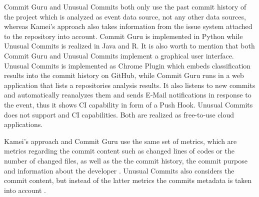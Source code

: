 Commit Guru and Unusual Commits both only use the past commit history of the project which is analyzed as event data source, not any other data sources, whereas Kamei's approach also takes information from the issue system attached to the repository into account.
Commit Guru is implemented in Python while Unusual Commits is realized in Java and R. It is also worth to mention that both Commit Guru and Unusual Commits implement a graphical user interface. Unusual Commits is implemented as Chrome Plugin which embeds classification results into the commit history on GitHub, while Commit Guru runs in a web application that lists a repositories analysis results. It also listens to new commits and automatically reanalyzes them and sends E-Mail notifications in response to the event, thus it shows CI capability in form of a Push Hook. Unusual Commits does not support and CI capabilities. Both are realized as free-to-use cloud applications. \cite{Rosen2015,Goyal2017,Kamei2013}

Kamei's approach and Commit Guru use the same set of metrics, which are metrics regarding the commit content such as changed lines of codes or the number of changed files, as well as the the commit history, the commit purpose and information about the developer \cite{Rosen2015,Kamei2013}. Unusual Commits also considers the commit content, but instead of the latter metrics the commits metadata is taken into account \cite{Goyal2017}.



